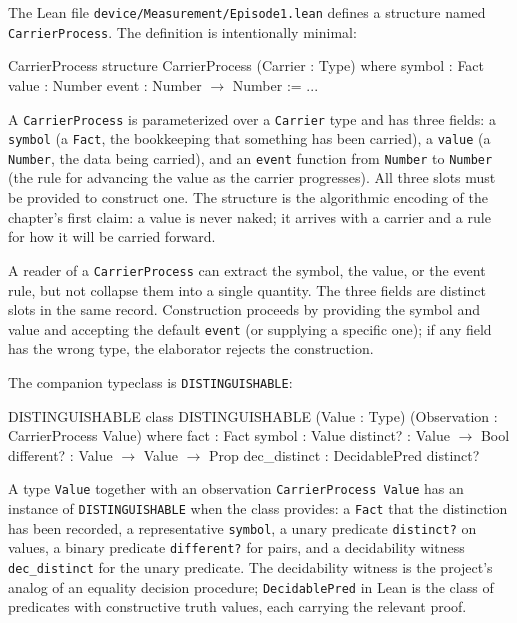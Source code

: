 The Lean file \texttt{device/Measurement/Episode1.lean} defines a structure
named \texttt{CarrierProcess}. The definition is intentionally minimal:

\begin{leanexcerpt}{CarrierProcess}
structure CarrierProcess (Carrier : Type) where
  symbol : Fact
  value  : Number
  event  : Number $\to$ Number := ...
\end{leanexcerpt}

A \texttt{CarrierProcess} is parameterized over a \texttt{Carrier} type
and has three fields: a \texttt{symbol} (a \texttt{Fact}, the bookkeeping
that something has been carried), a \texttt{value} (a \texttt{Number}, the
data being carried), and an \texttt{event} function from \texttt{Number}
to \texttt{Number} (the rule for advancing the value as the carrier
progresses). All three slots must be provided to construct one. The
structure is the algorithmic encoding of the chapter's first claim: a
value is never naked; it arrives with a carrier and a rule for how it
will be carried forward.

A reader of a \texttt{CarrierProcess} can extract the symbol, the value,
or the event rule, but not collapse them into a single quantity. The
three fields are distinct slots in the same record. Construction
proceeds by providing the symbol and value and accepting the default
\texttt{event} (or supplying a specific one); if any field has the wrong
type, the elaborator rejects the construction.

The companion typeclass is \texttt{DISTINGUISHABLE}:

\begin{leanexcerpt}{DISTINGUISHABLE}
class DISTINGUISHABLE
    (Value : Type)
    (Observation : CarrierProcess Value)
  where
  fact         : Fact
  symbol       : Value
  distinct?    : Value $\to$ Bool
  different?   : Value $\to$ Value $\to$ Prop
  dec_distinct : DecidablePred distinct?
\end{leanexcerpt}

A type \texttt{Value} together with an observation
\texttt{CarrierProcess Value} has an instance of
\texttt{DISTINGUISHABLE} when the class provides: a \texttt{Fact} that
the distinction has been recorded, a representative \texttt{symbol}, a
unary predicate \texttt{distinct?} on values, a binary predicate
\texttt{different?} for pairs, and a decidability witness
\texttt{dec\_distinct} for the unary predicate. The decidability witness
is the project's analog of an equality decision procedure;
\texttt{DecidablePred} in Lean is the class of predicates with
constructive truth values,
each carrying the relevant proof.

